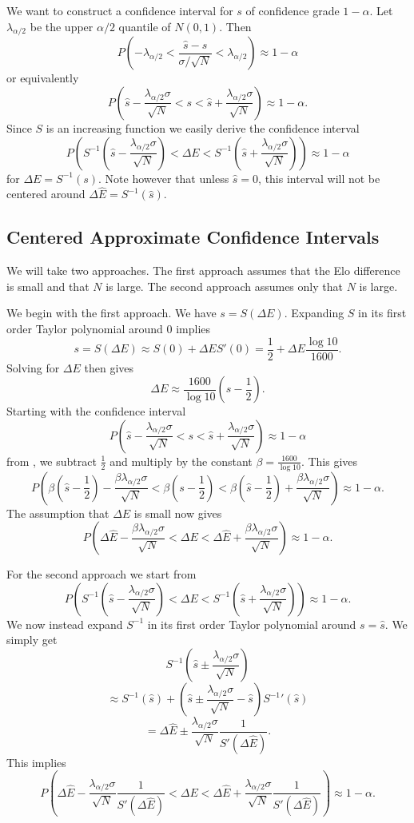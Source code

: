 \documentclass{article}
\theoremstyle{plain}
\theoremstyle{definition}
\begin{document}
We want to construct a confidence interval
for $s$ of confidence grade $1-\alpha$. Let $\lambda_{\alpha/2}$ be the upper $\alpha/2$
quantile of $N(0,1)$. Then $$P\left(-\lambda_{\alpha/2}<\frac{\hat s-s}{\sigma/\sqrt{N}}<
\lambda_{\alpha/2}\right)\approx1-\alpha$$ or equivalently $$P\left(\hat s-
\frac{\lambda_{\alpha/2}\sigma}{\sqrt{N}}<s<\hat s+\frac{\lambda_{\alpha/2}\sigma}{\sqrt{N}}
\right)\approx1-\alpha.$$ Since $S$ is an increasing function we easily derive
the confidence interval
$$P\left(S^{-1}\left(\hat s-\frac{\lambda_{\alpha/2}\sigma}{\sqrt{N}}\right)<\Delta E<
S^{-1}\left(\hat s+\frac{\lambda_{\alpha/2}\sigma}{\sqrt{N}}\right)\right)\approx1-\alpha$$
for $\Delta E=S^{-1}(s)$. Note however that unless $\hat s=0$, this interval will not be
centered around $\Delta\hat E=S^{-1}(\hat s)$.

\subsection{Centered Approximate Confidence Intervals}
We will take two approaches. The first approach assumes that the Elo difference is small
and that $N$ is large. The second approach assumes only that $N$ is large.

We begin with the first approach. We have $s=S(\Delta E)$. Expanding $S$ in its first
order Taylor polynomial around $0$ implies $$s=S(\Delta E)\approx S(0)+\Delta ES'(0)=\frac12+
\Delta E\frac{\log10}{1600}.$$ Solving for $\Delta E$ then gives
$$\Delta E\approx\frac{1600}{\log10}\left(s-\frac12\right).$$
Starting with the confidence interval $$P\left(\hat s-\frac{\lambda_{\alpha/2}\sigma}{\sqrt{N}}
<s<\hat s+\frac{\lambda_{\alpha/2}\sigma}{\sqrt{N}}\right)\approx1-\alpha$$ from
, we subtract $\frac12$ and multiply by the constant
$\beta=\frac{1600}{\log10}$. This gives
$$P\left(\beta\left(\hat s-\frac12\right)-\frac{\beta\lambda_{\alpha/2}\sigma}
{\sqrt{N}}<\beta\left(s-\frac12\right)<\beta\left(\hat s-\frac12\right)+
\frac{\beta\lambda_{\alpha/2}\sigma}{\sqrt{N}}\right)\approx1-\alpha.$$
The assumption that $\Delta E$ is small now gives $$P\left(\Delta\hat E-
\frac{\beta\lambda_{\alpha/2}\sigma}{\sqrt{N}}<\Delta E<\Delta\hat E+
\frac{\beta\lambda_{\alpha/2}\sigma}{\sqrt{N}}\right)\approx1-\alpha.$$

For the second approach we start from
$$P\left(S^{-1}\left(\hat s-\frac{\lambda_{\alpha/2}\sigma}{\sqrt{N}}\right)<\Delta E<
S^{-1}\left(\hat s+\frac{\lambda_{\alpha/2}\sigma}{\sqrt{N}}\right)\right)\approx1-\alpha.$$
We now instead expand $S^{-1}$ in its first order Taylor polynomial around $s=\hat s$.
We simply get $$S^{-1}\left(\hat s\pm\frac{\lambda_{\alpha/2}
\sigma}{\sqrt{N}}\right)$$$$\approx S^{-1}\left(\hat s\right)+\left(\hat s\pm\frac{\lambda_{\alpha/2}
\sigma}{\sqrt{N}}-\hat s\right)S^{-1}{'}\left(\hat s\right)$$$$=
\Delta\hat E\pm\frac{\lambda_{\alpha/2}\sigma}{\sqrt{N}}\frac1{S'\left(\Delta\hat E\right)}.$$
This implies $$P\left(\Delta\hat E-\frac{\lambda_{\alpha/2}\sigma}{\sqrt{N}}
\frac1{S'\left(\Delta\hat E\right)}<\Delta E<\Delta\hat E+\frac{\lambda_{\alpha/2}\sigma}{\sqrt{N}}
\frac1{S'\left(\Delta\hat E\right)}\right)\approx1-\alpha.$$



\end{document}
